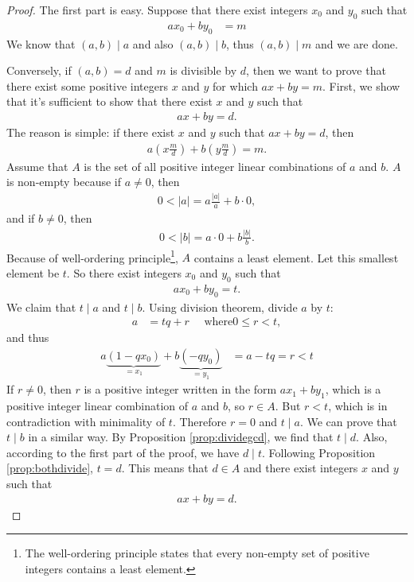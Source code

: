 \documentclass{subfile}
\begin{document}
	\begin{proof}
		The first part is easy. Suppose that there exist integers $x_0$ and $y_0$ such that
		\begin{align*}
			ax_0 + by_0
				& = m
		\end{align*}
		We know that $(a,b)\mid a$ and also $(a,b)\mid b$, thus $(a,b)\mid m$ and we are done.
		
		Conversely, if $(a,b)=d$ and $m$ is divisible by $d$, then we want to prove that there exist some positive integers $x$ and $y$ for which $ax+by=m$. First, we show that it's sufficient to show that there exist $x$ and $y$ such that
		\begin{align*} ax + by = d.\end{align*}
		The reason is simple: if there exist $x$ and $y$ such that $ax + by = d$, then
		\begin{align*} a\left( x \frac{m}{d} \right)  + b \left( y \frac{m}{d} \right) = m.\end{align*}
		Assume that $A$ is the set of all positive integer linear combinations of $a$ and $b$. $A$ is non-empty because if $a \neq 0$, then
		\begin{align*}	0<|a| = a\frac{|a|}{a} + b\cdot 0, \end{align*}
		and if $b \neq 0$, then
		\begin{align*}	0<|b| =  a\cdot 0 + b \frac{|b|}{b}. \end{align*}
		Because of well-ordering principle\footnote{The well-ordering principle states that every non-empty set of positive integers contains a least element.}, $A$ contains a least element. Let this smallest element be $t$. So there exist integers $x_0$ and $y_0$ such that
		\begin{align*} ax_0 + by_0 = t.\end{align*}
		We claim that $t\mid a$ and $t\mid b$. Using division theorem, divide $a$ by $t$:
		\begin{align*}
			a 
				& = tq+r\quad\mbox{ where}0 \leq r < t,
		\end{align*}
		and thus
		\begin{align*}
			a\underbrace{(1-qx_0)}_{=x_1}+b\underbrace{(-qy_0)}_{=y_1}
				& =a-tq=r<t
		\end{align*}
		If $r \neq 0$, then $r$ is a positive integer written in the form $ax_1+by_1$, which is a positive integer linear combination of $a$ and $b$, so $r \in A$. But $r<t$, which is in contradiction with minimality of $t$. Therefore $r=0$ and $t\mid a$. We can prove that $t\mid b$ in a similar way. By Proposition \ref{prop:dividegcd}, we find that $t\mid d$. Also, according to the first part of the proof, we have $d\mid t$. Following Proposition \ref{prop:bothdivide}, $t=d$. This means that $d \in A$ and there exist integers $x$ and $y$ such that
		\begin{align*} ax + by = d.\end{align*}
	\end{proof}
	
\end{document}
